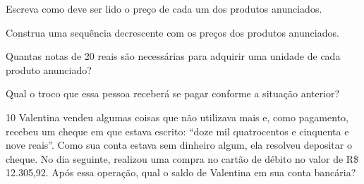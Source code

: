 \begin{escolha}
\item
  Escreva como deve ser lido o preço de cada um dos produtos anunciados.
\item{}
\item{}

\item {}

\item {}

\item {}


\item
  Construa uma sequência decrescente com os preços dos produtos anunciados.
\item\item {}

\item
  Quantas notas de 20 reais são necessárias para adquirir uma unidade de
  cada produto anunciado?

\item {}

\item
  Qual o troco que essa pessoa receberá se pagar conforme a situação anterior?
\item{}
\end{escolha}

\num{10} Valentina vendeu algumas coisas que não utilizava mais e, como
pagamento, recebeu um cheque em que estava escrito: “doze mil quatrocentos
e cinquenta e nove reais”. Como sua conta estava sem dinheiro algum, ela
resolveu depositar o cheque. No dia seguinte, realizou uma compra no cartão de débito no valor de R\$ 12.305,92. Após essa operação, qual o
saldo de Valentina em sua conta bancária?

\begin{mdframed}[linewidth=2pt,linecolor=salmao]
\mbox{}\vspace*{6cm}
\end{mdframed}


